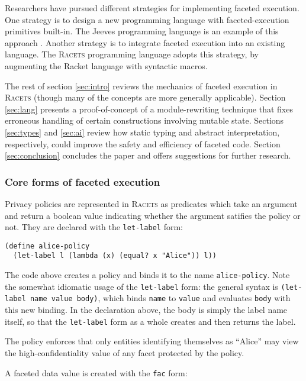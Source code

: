 \documentclass{article}
\begin{document}
Researchers have pursued different strategies for implementing faceted execution. One strategy is to design a new programming language with faceted-execution primitives built-in. The Jeeves programming language is an example of this approach \cite{jeeves}. Another strategy is to integrate faceted execution into an existing language. The \textsc{Racets} programming language \cite{racets} adopts this strategy, by augmenting the Racket language with syntactic macros.

The rest of section \ref{sec:intro} reviews the mechanics of faceted execution in \textsc{Racets} (though many of the concepts are more generally applicable). Section \ref{sec:lang} presents a proof-of-concept of a module-rewriting technique that fixes erroneous handling of certain constructions involving mutable state. Sections \ref{sec:types} and \ref{sec:ai} review how static typing and abstract interpretation, respectively, could improve the safety and efficiency of faceted code. Section \ref{sec:conclusion} concludes the paper and offers suggestions for further research.


\subsubsection{Core forms of faceted execution}
Privacy policies are represented in \textsc{Racets} as predicates which take an argument and return a boolean value indicating whether the argument satifies the policy or not. They are declared with the \texttt{let-label} form:

\begin{lstlisting}
(define alice-policy
  (let-label l (lambda (x) (equal? x "Alice")) l))
\end{lstlisting}

The code above creates a policy and binds it to the name \texttt{alice-policy}. Note the somewhat idiomatic usage of the \texttt{let-label} form: the general syntax is \texttt{(let-label name value body)}, which binds \texttt{name} to \texttt{value} and evaluates \texttt{body} with this new binding. In the declaration above, the body is simply the label name itself, so that the \texttt{let-label} form as a whole creates and then returns the label.

The policy enforces that only entities identifying themselves as ``Alice'' may view the high-confidentiality value of any facet protected by the policy.

A faceted data value is created with the \texttt{fac} form:
\end{document}
